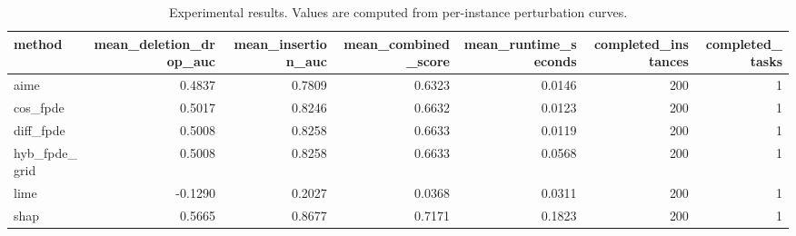 \begin{table}[t]
\caption{Experimental results. Values are computed from per-instance perturbation curves.}
\label{tab:main_results_computed}
\centering
\begin{tabular}{lrrrrrr}
\toprule
method & mean\_deletion\_drop\_auc & mean\_insertion\_auc & mean\_combined\_score & mean\_runtime\_seconds & completed\_instances & completed\_tasks \\
\midrule
aime & 0.4837 & 0.7809 & 0.6323 & 0.0146 & 200 & 1 \\
cos\_fpde & 0.5017 & 0.8246 & 0.6632 & 0.0123 & 200 & 1 \\
diff\_fpde & 0.5008 & 0.8258 & 0.6633 & 0.0119 & 200 & 1 \\
hyb\_fpde\_grid & 0.5008 & 0.8258 & 0.6633 & 0.0568 & 200 & 1 \\
lime & -0.1290 & 0.2027 & 0.0368 & 0.0311 & 200 & 1 \\
shap & 0.5665 & 0.8677 & 0.7171 & 0.1823 & 200 & 1 \\
\bottomrule
\end{tabular}

\end{table}
